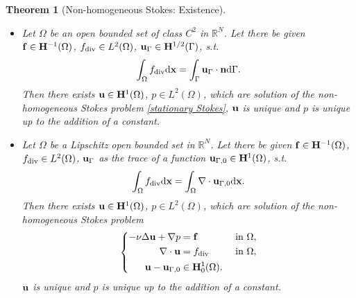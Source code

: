 \documentclass[oneside]{book}
\numberwithin{equation}{section}
\newtheorem{theorem}{Theorem}[section]
\begin{document}
\begin{theorem}[Non-homogeneous Stokes: Existence]
    \begin{itemize}
        \item[(i)] Let $\Omega$ be an open bounded set of class $C^2$ in $\mathbb{R}^N$. Let there be given ${\bf f}\in{\bf H}^{-1}(\Omega)$, $f_{\rm div}\in L^2(\Omega)$, ${\bf u}_\Gamma\in{\bf H}^{1/2}(\Gamma)$, s.t.
        \begin{align*}
            \int_\Omega f_{\rm div}{\rm d}{\bf x} = \int_\Gamma {\bf u}_\Gamma\cdot{\bf n}{\rm d}\Gamma.
        \end{align*}
        Then there exists ${\bf u}\in{\bf H}^1(\Omega)$, $p\in L^2(\Omega)$, which are solution of the non-homogeneous Stokes problem \eqref{stationary Stokes}, ${\bf u}$ is unique and $p$ is unique up to the addition of a constant.
        \item[(ii)] Let $\Omega$ be a Lipschitz open bounded set in $\mathbb{R}^N$. Let there be given ${\bf f}\in{\bf H}^{-1}(\Omega)$, $f_{\rm div}\in L^2(\Omega)$, ${\bf u}_\Gamma$ as the trace of a function ${\bf u}_{\Gamma,0}\in{\bf H}^1(\Omega)$, s.t.
        \begin{align*}
            \int_\Omega f_{\rm div}{\rm d}{\bf x} = \int_\Omega \nabla\cdot{\bf u}_{\Gamma,0}{\rm d}{\bf x}.
        \end{align*}
        Then there exists ${\bf u}\in{\bf H}^1(\Omega)$, $p\in L^2(\Omega)$, which are solution of the non-homogeneous Stokes problem
        \begin{equation*}
            \left\{\begin{split}
                -\nu\Delta{\bf u} + \nabla p &= {\bf f} &&\mbox{ in } \Omega,\\
                \nabla\cdot{\bf u} &= f_{\rm div} &&\mbox{ in } \Omega,\\
                {\bf u} - {\bf u}_{\Gamma,0}&\in{\bf H}_0^1(\Omega).
            \end{split}\right.
        \end{equation*}
        ${\bf u}$ is unique and $p$ is unique up to the addition of a constant.
    \end{itemize}
\end{theorem}
\end{document}
